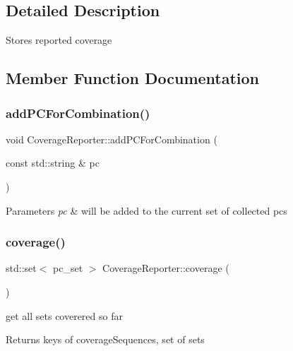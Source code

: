 \subsection{Detailed Description}
Stores reported coverage 

\subsection{Member Function Documentation}
\mbox{\label{classCoverageReporter_a477866b25aa53c3ebbc60de7b7863943}} 
\subsubsection{\texorpdfstring{add\+P\+C\+For\+Combination()}{addPCForCombination()}}
{\footnotesize\ttfamily void Coverage\+Reporter\+::add\+P\+C\+For\+Combination (\begin{DoxyParamCaption}\item[{const std\+::string \&}]{pc }\end{DoxyParamCaption})}


\begin{DoxyParams}{Parameters}
{\em pc} & will be added to the current set of collected pcs \\
\hline
\end{DoxyParams}
\mbox{\label{classCoverageReporter_af515596c46758142ea7aa7dbbab47b7e}} 
\subsubsection{\texorpdfstring{coverage()}{coverage()}}
{\footnotesize\ttfamily std\+::set$<$ pc\+\_\+set $>$ Coverage\+Reporter\+::coverage (\begin{DoxyParamCaption}{ }\end{DoxyParamCaption})}

get all sets coverered so far \begin{DoxyReturn}{Returns}
keys of coverage\+Sequences, set of sets 
\end{DoxyReturn}
\mbox{\label{classCoverageReporter_a046428d09487a4a3d3420caf77f436df}} 
